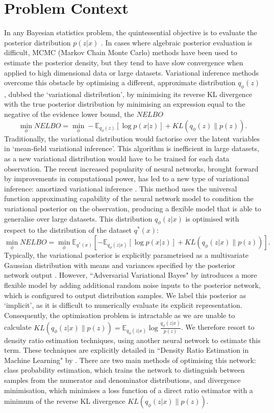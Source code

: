 \documentclass[honours,12pt]{unswthesis}
\newcommand{\E}{\mathbb{E}}
\numberwithin{equation}{section}
\theoremstyle{definition}
\begin{document}
\section{Problem Context}
In any Bayesian statistics problem, the quintessential objective is to evaluate the posterior distribution $p(z|x)$ \citep{gelman}. In cases where algebraic posterior evaluation is difficult, MCMC (Markov Chain Monte Carlo) methods have been used to estimate the posterior density, but they tend to have slow convergence when applied to high dimensional data or large datasets. Variational inference methods overcome this obstacle by optimising a different, approximate distribution $q_\phi(z)$, dubbed the `variational distribution', by minimising its reverse KL divergence with the true posterior distribution by minimising an expression equal to the negative of the evidence lower bound, the $NELBO$ \citep{blei}
\[\min_{\phi} NELBO = \min_\phi -\E_{q_\phi(z)}[\log p(x|z)]+KL(q_\phi(z)\|p(z)).\] Traditionally, the variational distribution would factorise over the latent variables in `mean-field variational inference'. This algorithm is inefficient in large datasets, as a new variational distribution would have to be trained for each data observation. The recent increased popularity of neural networks, brought forward by improvements in computational power, has led to a new type of variational inference: amortized variational inference \citep{ADVVI}. This method uses the universal function approximating capability of the neural network model to condition the variational posterior on the observation, producing a flexible model that is able to generalise over large datasets. This distribution $q_\phi(z|x)$ is optimised with respect to the distribution of the dataset $q^*(x)$: 
\[\min_{\phi} NELBO = \min_\phi \E_{q^*(x)}\left[-\E_{q_\phi(z|x)}[\log p(x|z)]+KL(q_\phi(z|x)\|p(z))\right].\]
Typically, the variational posterior is explicitly parametrised as a multivariate Gaussian distribution with means and variances specified by the posterior network output \citep{kingma}. However, ``Adversarial Variational Bayes" by \citet{mescheder} introduces a more flexible model by adding additional random noise inputs to the posterior network, which is configured to output distribution samples. We label this posterior as `implicit', as it is difficult to numerically evaluate its explicit representation. Consequently, the optimisation problem is intractable as we are unable to calculate $KL(q_\phi(z|x)\|p(z))=\E_{q_\phi(z|x)}\log \frac{q_\phi(z|x)}{p(z)}$. We therefore resort to density ratio estimation techniques, using another neural network to estimate this term. These techniques are explicitly detailed in ``Density Ratio Estimation in Machine Learning" by \citet{sugiyama}. There are two main methods of optimising this network: class probability estimation, which trains the network to distinguish between samples from the numerator and denominator distributions, and divergence minimisation, which minimises a loss function of a direct ratio estimator with a minimum of the reverse KL divergence $KL(q_\phi(z|x)\|p(z))$. 
\end{document}
